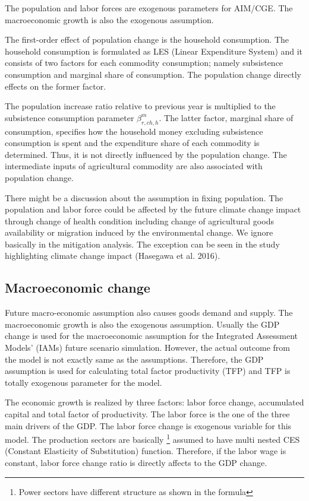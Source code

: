 \documentclass[10pt,a4paper,titlepage,dvipdfmx]{book}
\begin{document}
\begin{itemize}
The population and labor forces are exogenous parameters for AIM/CGE. The macroeconomic growth is also the exogenous assumption.

The first-order effect of population change is the household consumption. The household consumption is formulated as LES (Linear Expenditure System) and it consists of two factors for each commodity consumption; namely subsistence consumption and marginal share of consumption. The population change directly effects on the former factor.

The population increase ratio relative to previous year is multiplied to the subsistence consumption parameter $\beta _{r,ch,h}^{m}$. The latter factor, marginal share of consumption, specifies how the household money excluding subsistence consumption is spent and the expenditure share of each commodity is determined. Thus, it is not directly influenced by the population change. The intermediate inputs of agricultural commodity are also associated with population change.

There might be a discussion about the assumption in fixing population. The population and labor force could be affected by the future climate change impact through change of health condition including change of agricultural goods availability or migration induced by the environmental change. We ignore basically in the mitigation analysis. The exception can be seen in the study highlighting climate change impact (Hasegawa et al. 2016).

\subsection{\label{subsec:MacCha}{Macroeconomic change}}

Future macro-economic assumption also causes goods demand and supply. The macroeconomic growth is also the exogenous assumption. Usually the GDP change is used for the macroeconomic assumption for the Integrated Assessment Models' (IAMs) future scenario simulation. However, the actual outcome from the model is not exactly same as the assumptions. Therefore, the GDP assumption is used for calculating total factor productivity (TFP) and TFP is totally exogenous parameter for the model.

The economic growth is realized by three factors: labor force change, accumulated capital and total factor of productivity. The labor force is the one of the three main drivers of the GDP. The labor force change is exogenous variable for this model. The production sectors are basically \footnote{Power sectors have different structure as shown in the formula} assumed to have multi nested CES (Constant Elasticity of Substitution) function. Therefore, if the labor wage is constant, labor force change ratio is directly affects to the GDP change.


\end{itemize}
\end{document}
